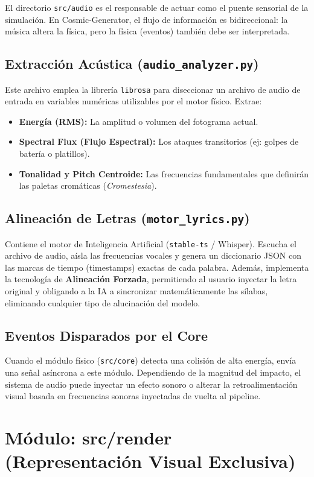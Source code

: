 \documentclass[12pt]{book}
\begin{document}
El directorio \texttt{src/audio} es el responsable de actuar como el puente sensorial de la simulación. En Cosmic-Generator, el flujo de información es bidireccional: la música altera la física, pero la física (eventos) también debe ser interpretada.

\subsection{Extracción Acústica (\texttt{audio\_analyzer.py})}
Este archivo emplea la librería \texttt{librosa} para diseccionar un archivo de audio de entrada en variables numéricas utilizables por el motor físico. Extrae:
\begin{itemize}
    \item \textbf{Energía (RMS):} La amplitud o volumen del fotograma actual.
    \item \textbf{Spectral Flux (Flujo Espectral):} Los ataques transitorios (ej: golpes de batería o platillos).
    \item \textbf{Tonalidad y Pitch Centroide:} Las frecuencias fundamentales que definirán las paletas cromáticas (\textit{Cromestesia}).
\end{itemize}

\subsection{Alineación de Letras (\texttt{motor\_lyrics.py})}
Contiene el motor de Inteligencia Artificial (\texttt{stable-ts} / Whisper). Escucha el archivo de audio, aísla las frecuencias vocales y genera un diccionario JSON con las marcas de tiempo (timestamps) exactas de cada palabra. Además, implementa la tecnología de \textbf{Alineación Forzada}, permitiendo al usuario inyectar la letra original y obligando a la IA a sincronizar matemáticamente las sílabas, eliminando cualquier tipo de alucinación del modelo.

\subsection{Eventos Disparados por el Core}
Cuando el módulo físico (\texttt{src/core}) detecta una colisión de alta energía, envía una señal asíncrona a este módulo. Dependiendo de la magnitud del impacto, el sistema de audio puede inyectar un efecto sonoro o alterar la retroalimentación visual basada en frecuencias sonoras inyectadas de vuelta al pipeline.

\section{Módulo: src/render (Representación Visual Exclusiva)}
\end{document}
